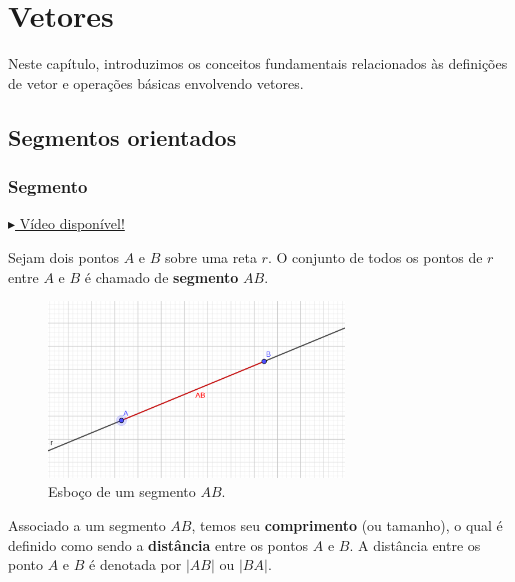 
\chapter{Vetores}\label{cap_vetor}
\thispagestyle{fancy}

Neste capítulo, introduzimos os conceitos fundamentais relacionados às definições de vetor e operações básicas envolvendo vetores.

\section{Segmentos orientados}\label{cap_vetor_sec_segorien}

\subsection{Segmento}

\begin{flushright}
  \href{https://archive.org/details/definicao-de-segmento}{$\blacktriangleright$ Vídeo disponível!}
\end{flushright}

Sejam dois pontos $A$ e $B$ sobre uma reta $r$. O conjunto de todos os pontos de $r$ entre $A$ e $B$ é chamado de {\bf segmento} $AB$.

\begin{figure}[h!]
  \centering
  \includegraphics[width=0.7\textwidth]{./cap_vetor/dados/fig_segmento/fig_segmento}
  \caption{Esboço de um segmento $AB$.}
  \label{fig:segmento}
\end{figure}

Associado a um segmento $AB$, temos seu {\bf comprimento} (ou tamanho), o qual é definido como sendo a {\bf distância} entre os pontos $A$ e $B$. A distância entre os ponto $A$ e $B$ é denotada por $|AB|$ ou $|BA|$.

